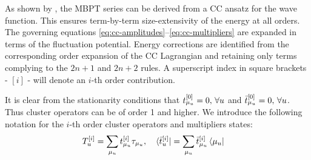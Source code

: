 As shown by \citeauthor{Koch1997-nm}, the \acrshort*{MBPT} series can be
derived from a \acrshort*{CC} ansatz for the wave function.
This ensures term-by-term size-extensivity of the energy at all
orders.\autocite{Helgaker2000-tz}
The governing equations
\eqref{eq:cc-amplitudes}--\eqref{eq:cc-multipliers} are expanded in
terms of the fluctuation potential. Energy corrections are identified
from the corresponding order expansion of the \acrshort*{CC} Lagrangian
and retaining only terms complying to the $2n+1$ and $2n+2$ rules.
\autocite{Helgaker1988-to, Helgaker1989-wl, Helgaker1992-ph}
A superscript index in square brackets - $[i]$ -  will denote an $i$-th
order contribution.

It is clear from the stationarity conditions that $t_{\mu_u}^{[0]} = 0, \,\forall u$ and
$\bar{t}_{\mu_u}^{[0]} = 0, \, \forall u$.
Thus cluster operators can be of order 1 and higher. We introduce the
following notation for the $i$-th order cluster operators and
multipliers states:
\begin{alignat}{2}
  T_u^{[i]} = \sum_{\mu_u}t_{\mu_u}^{[i]}\tau_{\mu_u},
  \quad&
  \bra{\bar{t}_{u}^{[i]}} = \sum_{\mu_u}\bar{t}_{\mu_u}^{[i]}\bra{\mu_u}
\end{alignat}

